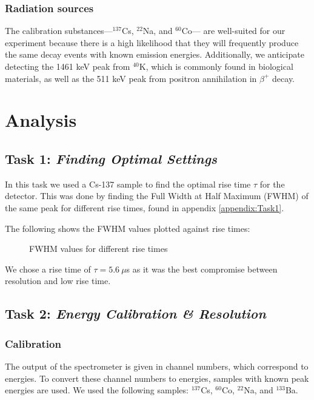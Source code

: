 \documentclass{article}
\begin{document}
\subsubsection{Radiation sources}
The calibration substances—$^{137}$Cs, $^{22}$Na, and $^{60}$Co— are well-suited for our experiment because there is a high likelihood that they will frequently produce the same decay events with known emission energies. Additionally, we anticipate detecting the 1461 keV peak from $^{40}$K, which is commonly found in biological materials, as well as the 511 keV peak from positron annihilation in $\beta^+$ decay.


\pagebreak{}

\section{Analysis}

\subsection{Task 1: \textit{Finding Optimal Settings}}

In this task we used a Cs-137 sample to find the optimal rise time $\tau$ for the detector. This was done by finding the Full Width at Half Maximum (FWHM) of the same peak for different rise times, found in appendix \ref{appendix:Task1}. 

The following shows the FWHM values plotted against rise times:

\begin{figure}[h!]
	\centering
	\scalebox{1}{}
	\caption{FWHM values for different rise times}
	\label{fig:risetimes}
\end{figure}

We chose a rise time of $\tau = 5.6 \ \mu$s as it was the best compromise between resolution and low rise time. 

\pagebreak{}

\subsection{Task 2: \textit{Energy Calibration \& Resolution}}
\subsubsection{Calibration}

The output of the spectrometer is given in channel numbers, which correspond to energies. To convert these channel numbers to energies, samples with known peak energies are used.
We used the following samples: $^{137}$Cs, $^{60}$Co, $^{22}$Na, and $^{133}$Ba.
\end{document}
